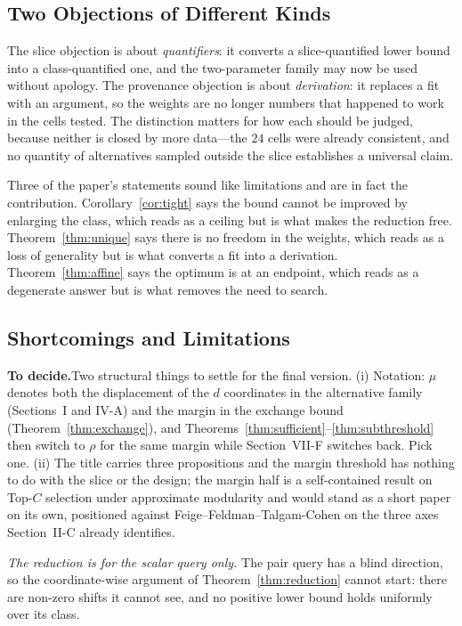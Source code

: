 \documentclass[conference]{IEEEtran}
\theoremstyle{definition}
\newif\ifshownotes\shownotestrue
\newcommand{\TODOPAR}[1]{\ifshownotes\par\vspace{2pt}\noindent%
  {\color{todocol}\textsf{\footnotesize\textbf{To decide.}\;#1}}\par\vspace{2pt}\fi}
\begin{document}
\subsection{Two Objections of Different Kinds}

The slice objection is about \emph{quantifiers}: it converts a slice-quantified lower bound
into a class-quantified one, and the two-parameter family may now be used without apology.
The provenance objection is about \emph{derivation}: it replaces a fit with an argument, so
the weights are no longer numbers that happened to work in the cells tested. The distinction
matters for how each should be judged, because neither is closed by more data---the $24$ cells
were already consistent, and no quantity of alternatives sampled outside the slice
establishes a universal claim.

Three of the paper's statements sound like limitations and are in fact the contribution.
Corollary~\ref{cor:tight} says the bound cannot be improved by enlarging the class, which
reads as a ceiling but is what makes the reduction free. Theorem~\ref{thm:unique} says there
is no freedom in the weights, which reads as a loss of generality but is what converts a fit
into a derivation. Theorem~\ref{thm:affine} says the optimum is at an endpoint, which reads
as a degenerate answer but is what removes the need to search.

\subsection{Shortcomings and Limitations}
\TODOPAR{Two structural things to settle for the final version. (i) Notation:
$\mu$ denotes both the displacement of the $d$ coordinates in the alternative family
(Sections~I and IV-A) and the margin in the exchange bound (Theorem~\ref{thm:exchange}),
and Theorems~\ref{thm:sufficient}--\ref{thm:subthreshold} then switch to $\rho$ for the same margin while
Section~VII-F switches back. Pick one. (ii) The title carries three propositions and the
margin threshold has nothing to do with the slice or the design; the margin half is a
self-contained result on Top-$C$ selection under approximate modularity and would stand as a
short paper on its own, positioned against Feige--Feldman--Talgam-Cohen on the three axes
Section~II-C already identifies.}

\emph{The reduction is for the scalar query only.} The pair query has a blind direction, so
the coordinate-wise argument of Theorem~\ref{thm:reduction} cannot start: there are non-zero
shifts it cannot see, and no positive lower bound holds uniformly over its class.
\end{document}
